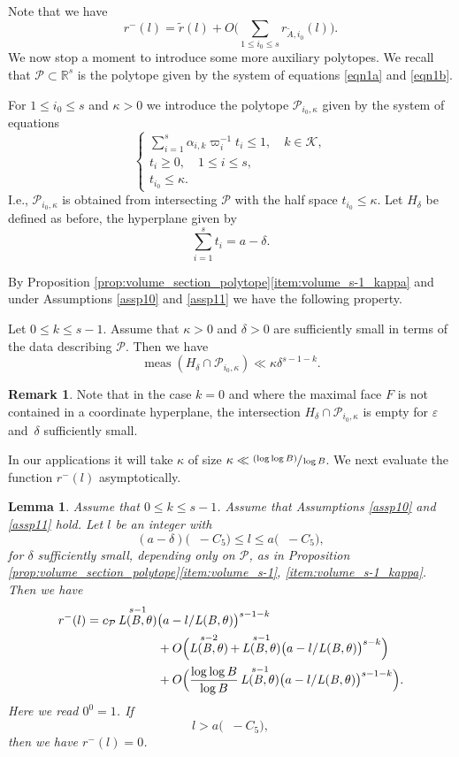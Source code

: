 \documentclass[JEP,XML,SOM,Unicode,published]{cedram}
\let\epsilon\varepsilon
\newcommand{\psfrac}[2]{\sfrac{(#1)}{#2}}
\DeclareMathOperator{\LBt}{\mathit{L(B,\theta)}}
\let\del\delta
\let\eps\epsilon
\let\kap\kappa
\newcommand{\calK}{\mathcal{K}}
\newcommand{\calP}{\mathcal{P}}
\newcommand\R{\mathbb{R}}
\DeclareMathOperator{\meas}{meas}
\newtheorem{lemma}[theorem]{Lemma}
\theoremstyle{definition}
\newtheorem{remark}[theorem]{Remark}
\numberwithin{theorem}{section}
\begin{document}
Note that we have
\[
r^-(l)=\tilde{r}(l)+O\biggl(\sum_{1\leq i_0\leq s} r_{\tilde{A},i_0}(l)\biggr).
\]
We now stop a moment to introduce some more auxiliary polytopes. We recall that $\calP\subset \R^s$ is the polytope given by the system of equations \eqref{eqn1a} and \eqref{eqn1b}.\par
For $1\leq i_0\leq s$ and $\kap>0$ we introduce the polytope $\calP_{i_0,\kap}$ given by the system of equations
\[
\begin{cases}
\sum_{i=1}^s \alpha_{i,k} \varpi_i^{-1} t_i\leq 1,\quad k\in \calK,\\
t_i\geq 0,\quad 1\leq i\leq s,\\
t_{i_0}\leq \kap.
\end{cases}
\]
I.e., $\calP_{i_0,\kap}$ is obtained from intersecting $\calP$ with the half space $t_{i_0}\leq \kap$. Let $H_{\del}$ be defined as before, \ie the hyperplane given by
\[
\sum_{i=1}^s t_i= a-\del.
\]

By Proposition \ref{prop:volume_section_polytope}\eqref{item:volume_s-1_kappa} and under Assumptions \ref{assp10} and \ref{assp11} we have the following property.\par
Let $0\leq k\leq s-1$. Assume that $\kappa>0$ and $\del>0$ are sufficiently small in terms of the data describing $\calP$. Then we have
\begin{equation}\label{eqn65a}
\meas (H_{\del}\cap \calP_{i_0,\kap}) \ll \kap\del^{s-1-k}.
\end{equation}

\begin{remark}
Note that in the case $k=0$ and where the maximal face $F$ is not contained in a coordinate hyperplane, the intersection $H_{\del}\cap \calP_{i_0,\kap}$ is empty for $\eps$ and~$\del$ sufficiently small.\end{remark}

In our applications it will take $\kap$ of size $\kap\ll \psfrac{\log \log B}{\log B}$. We next evaluate the function $r^-(l)$ asymptotically.\par

\begin{lemma}\label{rmin}
Assume that $0\leq k\leq s-1$. Assume that Assumptions \ref{assp10} and \ref{assp11} hold.
Let $l$ be an integer with
\[
(a-\del) \bigl(\LBt-C_5\bigr) \leq l\leq a \bigl(\LBt-C_5\bigr) ,
\]
for $\del$ sufficiently small, depending only on $\calP$, as in Proposition \ref{prop:volume_section_polytope}\eqref{item:volume_s-1}, \eqref{item:volume_s-1_kappa}. 
Then we have
\begin{align*}
r^-(l)=c_{\calP} \LBt^{s-1}& \bigl(a- l/{\LBt}\bigr)^{s-1-k} \\
&+O\Bigl(\LBt^{s-2}+ \LBt^{s-1} \bigl(a- l/{\LBt}\bigr)^{s-k}\Bigr)\\
&+ O\Bigl(\frac{\log \log B}{\log B} \LBt^{s-1} \bigl(a- l/{\LBt}\bigr)^{s-1-k} \Bigr) .
\end{align*}
Here we read $0^0=1$.
If
\[
l> a \bigl(\LBt-C_5\bigr) ,
\]
then we have $r^-(l)=0$.
\end{lemma}
\end{document}
